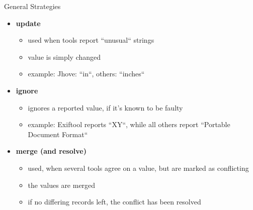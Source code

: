 \documentclass{beamer}
\begin{document}
\begin{frame}{General Strategies}

   \begin{itemize}
   \item \textbf{update}
   \begin{itemize}
	   \item used when tools report ``unusual`` strings
	   \item value is simply changed
	   \item example: Jhove: ``in``, others: ``inches``
   \end{itemize}
   \item \textbf{ignore}
   \begin{itemize}
   		\item ignores a reported value, if it's known to be faulty
   		\item example: Exiftool reports ``XY``, while all others report ``Portable Document Format``
   \end{itemize}
   \item \textbf{merge (and resolve)} 
   \begin{itemize}
   		\item used, when several tools agree on a value, but are marked as conflicting
   		\item the values are merged
   		\item if no differing records left, the conflict has been resolved
   \end{itemize}
   \end{itemize}
  
\note{

}
\end{frame}
\end{document}
